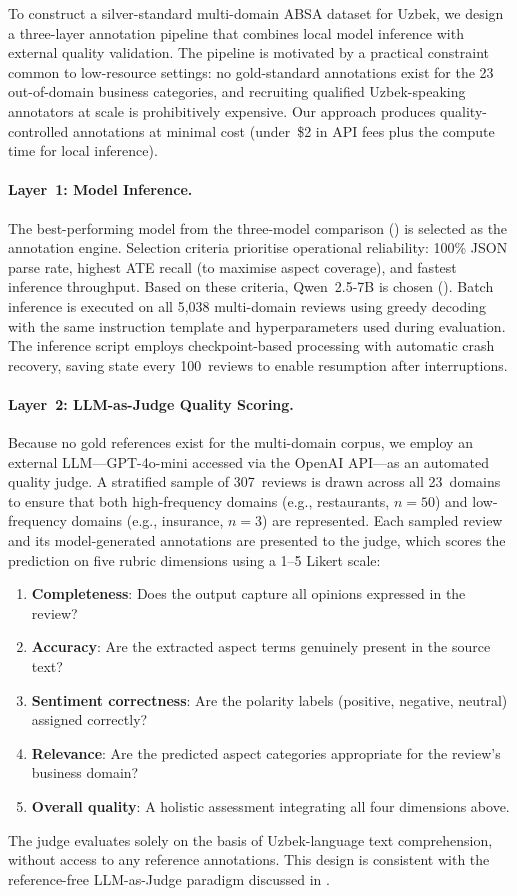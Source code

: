 \documentclass[runningheads]{llncs}
\begin{document}
To construct a silver-standard multi-domain ABSA dataset for Uzbek, we design a three-layer annotation pipeline that combines local model inference with external quality validation. The pipeline is motivated by a practical constraint common to low-resource settings: no gold-standard annotations exist for the 23 out-of-domain business categories, and recruiting qualified Uzbek-speaking annotators at scale is prohibitively expensive. Our approach produces quality-controlled annotations at minimal cost (under~\$2 in API fees plus the compute time for local inference).

\paragraph{Layer~1: Model Inference.} The best-performing model from the three-model comparison () is selected as the annotation engine. Selection criteria prioritise operational reliability: 100\% JSON parse rate, highest ATE recall (to maximise aspect coverage), and fastest inference throughput. Based on these criteria, Qwen~2.5-7B is chosen (). Batch inference is executed on all 5{,}038 multi-domain reviews using greedy decoding with the same instruction template and hyperparameters used during evaluation. The inference script employs checkpoint-based processing with automatic crash recovery, saving state every 100~reviews to enable resumption after interruptions.

\paragraph{Layer~2: LLM-as-Judge Quality Scoring.} Because no gold references exist for the multi-domain corpus, we employ an external LLM---GPT-4o-mini accessed via the OpenAI API---as an automated quality judge. A stratified sample of 307~reviews is drawn across all 23~domains to ensure that both high-frequency domains (e.g., restaurants, $n{=}50$) and low-frequency domains (e.g., insurance, $n{=}3$) are represented. Each sampled review and its model-generated annotations are presented to the judge, which scores the prediction on five rubric dimensions using a 1--5 Likert scale:
\begin{enumerate}[nosep]
  \item \textbf{Completeness}: Does the output capture all opinions expressed in the review?
  \item \textbf{Accuracy}: Are the extracted aspect terms genuinely present in the source text?
  \item \textbf{Sentiment correctness}: Are the polarity labels (positive, negative, neutral) assigned correctly?
  \item \textbf{Relevance}: Are the predicted aspect categories appropriate for the review's business domain?
  \item \textbf{Overall quality}: A holistic assessment integrating all four dimensions above.
\end{enumerate}
The judge evaluates solely on the basis of Uzbek-language text comprehension, without access to any reference annotations. This design is consistent with the reference-free LLM-as-Judge paradigm discussed in .
\end{document}
